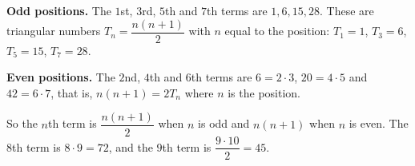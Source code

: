 \textbf{Odd positions.} The $1$st, $3$rd, $5$th and $7$th terms are $1,6,15,28$. These are triangular numbers $T_n=\dfrac{n(n+1)}{2}$ with $n$ equal to the position: $T_1=1$, $T_3=6$, $T_5=15$, $T_7=28$.

\textbf{Even positions.} The $2$nd, $4$th and $6$th terms are $6=2\cdot3$, $20=4\cdot5$ and $42=6\cdot7$, that is, $n(n+1)=2T_n$ where $n$ is the position.

So the $n$th term is $\dfrac{n(n+1)}{2}$ when $n$ is odd and $n(n+1)$ when $n$ is even. The $8$th term is $8\cdot9=\boxed{72}$, and the $9$th term is $\dfrac{9\cdot10}{2}=\boxed{45}$.
